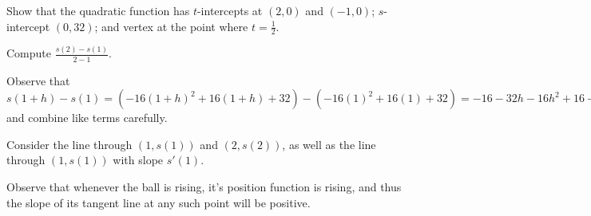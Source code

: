 \begin{bighint}
\ba
	\item Show that the quadratic function has $t$-intercepts at $(2,0)$ and $(-1,0)$; $s$-intercept $(0,32)$; and vertex at the point where $t = \frac{1}{2}$.
	\item Compute $\frac{s(2)-s(1)}{2-1}$.
	\item Observe that $s(1+h) - s(1) = (-16(1+h)^2 + 16(1+h) + 32) - (-16(1)^2 + 16(1) + 32) = -16 - 32h - 16h^2 + 16 + 16h + 32 - 32$ and combine like terms carefully.
	\item Consider the line through $(1,s(1))$ and $(2,s(2))$, as well as the line through $(1,s(1))$ with slope $s'(1)$.
	\item Observe that whenever the ball is rising, it's position function is rising, and thus the slope of its tangent line at any such point will be positive.
\ea
\end{bighint}
